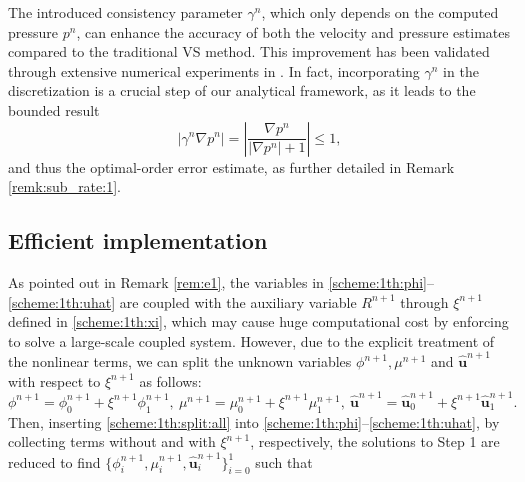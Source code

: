 \begin{remark} \label{rem:ivs:gamma}
	The introduced consistency parameter $\gamma^n$, which only depends on the computed pressure $p^n$, can enhance the accuracy of both the velocity and pressure estimates compared to the traditional VS method. This improvement has been validated through extensive numerical experiments in \cite{yakoubi2023enhancing}. In fact, incorporating $\gamma^n$ in the discretization is a crucial step of our analytical framework, as it leads to the bounded result
	\begin{equation} \label{gamma:bound}
		| \gamma^n \nabla p^n | = \left| \frac{\nabla p^n}{|\nabla p^n| + 1} \right| \leq 1, 
	\end{equation} 
	and thus the optimal-order error estimate, as further detailed in Remark \ref{remk:sub_rate:1}.
\end{remark}


\subsection{ Efficient implementation} \label{subsec:implement}
As pointed out in Remark \ref{rem:e1}, the variables in \eqref{scheme:1th:phi}--\eqref{scheme:1th:uhat} are coupled with the auxiliary variable $R^{n+1}$ through $\xi^{n+1}$ defined in \eqref{scheme:1th:xi}, which may cause huge computational cost by enforcing to solve a large-scale coupled system. 
However, due to the explicit treatment of the nonlinear terms, we can split the unknown variables $\phi^{n+1}, \mu^{n+1}$ and $\widehat{\bm u}^{n+1}$ with respect to $\xi^{n+1}$  as follows:
\begin{equation} \label{scheme:1th:split:all}
	\phi^{n+1}=\phi_0^{n+1}+\xi^{n+1} \phi_1^{n+1}, ~
	\mu^{n+1}=\mu_0^{n+1}+\xi^{n+1} \mu_1^{n+1}, ~ 
	\widehat{\bm u}^{n+1}  = \widehat{\bm u}^{n+1}_{0}+\xi^{n+1} \widehat{\bm u}^{n+1}_{1}. 
\end{equation} 
Then, inserting \eqref{scheme:1th:split:all}  into \eqref{scheme:1th:phi}--\eqref{scheme:1th:uhat}, by collecting terms without and with $\xi^{n+1}$, respectively, the solutions to Step 1 are reduced to find $\{\phi_i^{n+1}, \mu_i^{n+1}, \widehat{\bm u}_i^{n+1}\}_{i=0}^1$ such that

